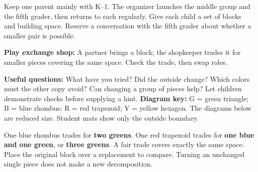 \documentclass[11pt]{article}
\newcommand{\Subhead}[1]{\par\vspace{4pt}{\large\bfseries #1}\par}
\begin{document}
Keep one parent mainly with K--1. The organizer launches the middle group and the fifth grader, then returns to each regularly. Give each child a set of blocks and building space. Reserve a conversation with the fifth grader about whether a smaller pair is possible.

\textbf{Play exchange shop:} A partner brings a block; the shopkeeper trades it for smaller pieces covering the same space. Check the trade, then swap roles.

\textbf{Useful questions:} What have you tried? Did the outside change? Which colors must the other copy avoid? Can changing a group of pieces help? Let children demonstrate checks before supplying a hint.
\newpage
{}
\textbf{Diagram key:} G = green triangle; B = blue rhombus; R = red trapezoid; Y = yellow hexagon. The diagrams below are reduced size. Student mats show only the outside boundary.
\Subhead{K--1 trades / F01-K}
One blue rhombus trades for \textbf{two greens}. One red trapezoid trades for \textbf{one blue and one green}, or \textbf{three greens}. A fair trade covers exactly the same space. Place the original block over a replacement to compare. Turning an unchanged single piece does not make a new decomposition.
\end{document}
